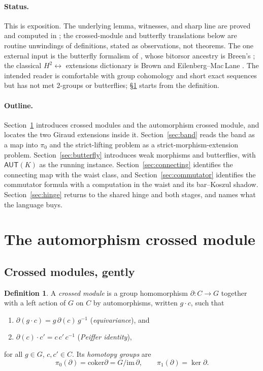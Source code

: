 \documentclass[11pt]{article}
\theoremstyle{definition}
\newtheorem{definition}[theorem]{Definition}
\newcommand{\coker}{\mathrm{coker}}
\newcommand{\AUT}{\mathsf{AUT}}
\newcommand{\pizero}{\pi_0}
\newcommand{\pione}{\pi_1}
\begin{document}
\paragraph{Status.} This is exposition. The underlying lemma, witnesses, and sharp line are proved
and computed in \cite{capstone}; the crossed-module and butterfly translations below are routine
unwindings of definitions, stated as observations, not theorems. The one external input is the
butterfly formalism of \cite{butterflies}, whose bitorsor ancestry is Breen's \cite{breen}; the
classical $H^2\leftrightarrow$ extensions dictionary is Brown \cite{brown} and
Eilenberg--Mac\,Lane \cite{eml}. The intended reader is comfortable with group cohomology and short
exact sequences but has not met $2$-groups or butterflies; \S\ref{sec:xmod} starts from the
definition.

\paragraph{Outline.} Section~\ref{sec:xmod} introduces crossed modules and the automorphism crossed
module, and locates the two Giraud extensions inside it. Section~\ref{sec:band} reads the band as a
map into $\pizero$ and the strict-lifting problem as a strict-morphism-extension problem.
Section~\ref{sec:butterfly} introduces weak morphisms and butterflies, with $\AUT(K)$ as the running
instance. Section~\ref{sec:connecting} identifies the connecting map with the waist class, and
Section~\ref{sec:commutator} identifies the commutator formula with a computation in the waist and
its bar--Koszul shadow. Section~\ref{sec:hinge} returns to the shared hinge and both stages, and
names what the language buys.

\section{The automorphism crossed module}\label{sec:xmod}

\subsection{Crossed modules, gently}

\begin{definition}\label{def:xmod}
A \emph{crossed module} is a group homomorphism $\partial\colon C\to G$ together with a left action
of $G$ on $C$ by automorphisms, written $g\cdot c$, such that
\begin{enumerate}
\item[(E)] $\partial(g\cdot c)=g\,\partial(c)\,g^{-1}$ \quad(\emph{equivariance}), and
\item[(P)] $\partial(c)\cdot c'=c\,c'\,c^{-1}$ \quad(\emph{Peiffer identity}),
\end{enumerate}
for all $g\in G$, $c,c'\in C$. Its \emph{homotopy groups} are
\[
\pizero(\partial)=\coker\partial=G/\mathrm{im}\,\partial,\qquad
\pione(\partial)=\ker\partial.
\]
\end{definition}
\end{document}
